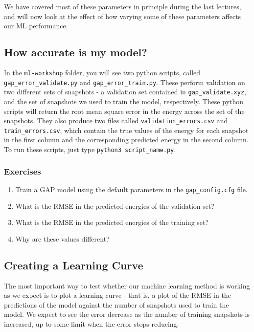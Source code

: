 \documentclass{article}
\begin{document}
We have covered most of these parameters in principle during the last lectures, and will now look at the effect of how varying some of these parameters affects our ML performance.

\subsection{How accurate is my model?}

In the \verb|ml-workshop| folder, you will see two python scripts, called \verb|gap_error_validate.py| and \verb|gap_error_train.py|. These perform validation on two different sets of snapshots - a validation set contained in \verb|gap_validate.xyz|, and the set of snapshots we used to train the model, respectively. These python scripts will return the root mean square error in the energy across the set of the snapshots. They also produce two files called \verb|validation_errors.csv| and \verb|train_errors.csv|, which contain the true values of the energy for each snapshot in the first column and the corresponding predicted energy in the second column. To run these scripts, just type \verb|python3 script_name.py|.

\subsubsection*{Exercises}

\begin{enumerate}
 
\item Train a GAP model using the default parameters in the \verb|gap_config.cfg| file.
\item What is the RMSE in the predicted energies of the validation set?
\item What is the RMSE in the predicted energies of the training set?
\item Why are these values different?
\end{enumerate}

\subsection{Creating a Learning Curve}

The most important way to test whether our machine learning method is working as we expect is to plot a learning curve - that is, a plot of the RMSE in the predictions of the model against the number of snapshots used to train the model. We expect to see the error decrease as the number of training snapshots is increased, up to some limit when the error stops reducing.
\end{document}
